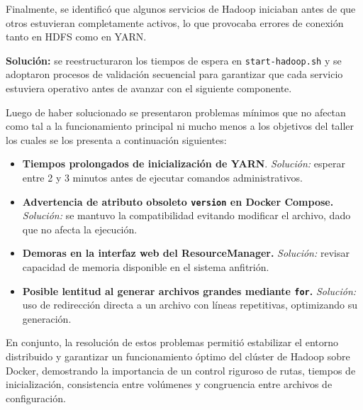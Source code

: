 Finalmente, se identificó que algunos servicios de Hadoop iniciaban antes de que otros estuvieran completamente activos, lo que provocaba errores de conexión tanto en HDFS como en YARN.

\textbf{Solución:} se reestructuraron los tiempos de espera en \texttt{start-hadoop.sh} y se adoptaron procesos de validación secuencial para garantizar que cada servicio estuviera operativo antes de avanzar con el siguiente componente.

\bigskip

Luego de haber solucionado se presentaron problemas mínimos que no afectan como tal a la funcionamiento principal ni mucho menos a los objetivos del taller los cuales se los presenta a continuación siguientes:

\begin{itemize}
    \item \textbf{Tiempos prolongados de inicialización de YARN}.  
    \textit{Solución:} esperar entre 2 y 3 minutos antes de ejecutar comandos administrativos.

    \item \textbf{Advertencia de atributo obsoleto \texttt{version} en Docker Compose.}  
    \textit{Solución:} se mantuvo la compatibilidad evitando modificar el archivo, dado que no afecta la ejecución.

    \item \textbf{Demoras en la interfaz web del ResourceManager.}  
    \textit{Solución:} revisar capacidad de memoria disponible en el sistema anfitrión.

    \item \textbf{Posible lentitud al generar archivos grandes mediante \texttt{for}.}  
    \textit{Solución:} uso de redirección directa a un archivo con líneas repetitivas, optimizando su generación.
\end{itemize}

En conjunto, la resolución de estos problemas permitió estabilizar el entorno distribuido y garantizar un funcionamiento óptimo del clúster de Hadoop sobre Docker, demostrando la importancia de un control riguroso de rutas, tiempos de inicialización, consistencia entre volúmenes y congruencia entre archivos de configuración.